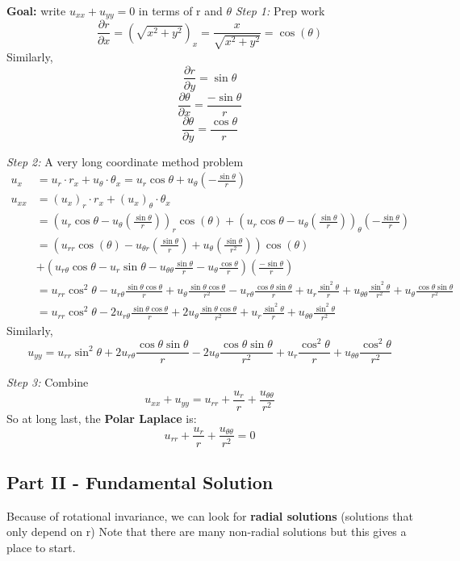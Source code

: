 \documentclass[12pt]{article}
\begin{document}
\textbf{Goal:} write $u_{xx} + u_{yy} = 0$ in terms of r and $\theta$
\emph{Step 1:} Prep work
\[\frac{\partial r}{\partial x} = (\sqrt{x^2 + y^2})_x = \frac{x}{\sqrt{x^2 + y^2}} = \cos(\theta)\]
Similarly, 
\[\frac{\partial r}{\partial y} = \sin \theta\]
\[\frac{\partial \theta}{\partial x} = \frac{-\sin \theta}{r}\]
\[\frac{\partial \theta}{\partial y} = \frac{\cos \theta}{r}\]

\emph{Step 2:} A very long coordinate method problem 
\begin{align*}
    u_x &= u_r \cdot r_x + u_\theta \cdot \theta_x = u_r \cos \theta + u_\theta (-\frac{\sin \theta}{r})\\
    u_{xx} &= (u_x)_r \cdot r_x + (u_x)_\theta \cdot \theta_x\\
    &= \left(u_{r} \cos \theta - u_{\theta} (\frac{\sin \theta}{r})\right)_r \cos(\theta) + \left(u_r \cos \theta - u_\theta \left(\frac{\sin \theta}{r}\right)\right)_\theta \left(-\frac{\sin \theta}{r}\right)\\
    &= \left(u_{rr}\cos(\theta) - u_{\theta r} \left(\frac{\sin \theta}{r}\right) + u_\theta\left(\frac{\sin \theta}{r^2}\right) \right)\cos(\theta)\\
    &+ \left(u_{r\theta}\cos\theta - u_r\sin \theta - u_{\theta \theta}\frac{\sin \theta}{r} - u_\theta \frac{\cos \theta}{r}\right)\left(\frac{-\sin \theta}{r}\right)\\
    &= u_{rr}\cos^2\theta - u_{r\theta} \frac{\sin \theta \cos \theta}{r} + u_\theta \frac{\sin \theta \cos \theta}{r^2}  -u_{r\theta} \frac{\cos \theta \sin \theta}{r} + u_r \frac{\sin^2 \theta}{r} + u_{\theta \theta} \frac{\sin^2 \theta}{r^2} + u_\theta \frac{\cos \theta \sin \theta}{r^2}\\
    &= u_{rr}\cos^2\theta - 2u_{r\theta} \frac{\sin \theta \cos \theta}{r} + 2u_\theta \frac{\sin \theta \cos \theta}{r^2} + u_r \frac{\sin^2 \theta}{r} + u_{\theta \theta} \frac{\sin^2 \theta}{r^2}
\end{align*}
Similarly,
\[u_{yy} = u_{rr}\sin^2\theta + 2u_{r\theta} \frac{\cos \theta \sin \theta}{r} - 2u_\theta \frac{\cos \theta \sin \theta}{r^2} + u_r\frac{\cos^2 \theta}{r} + u_{\theta \theta}\frac{\cos^2\theta}{r^2} \]

\emph{Step 3:} Combine
\[u_{xx} + u_{yy} = u_{rr} + \frac{u_r}{r} + \frac{u_{\theta \theta}}{r^2}\]
So at long last, the \textbf{Polar Laplace} is: 
\[\boxed{u_{rr} + \frac{u_r}{r} + \frac{u_{\theta \theta}}{r^2} = 0}\]

\subsection*{Part II - Fundamental Solution}
Because of rotational invariance, we can look for \textbf{radial solutions} (solutions that only depend on r)
Note that there are many non-radial solutions but this gives a place to start. 
\end{document}
